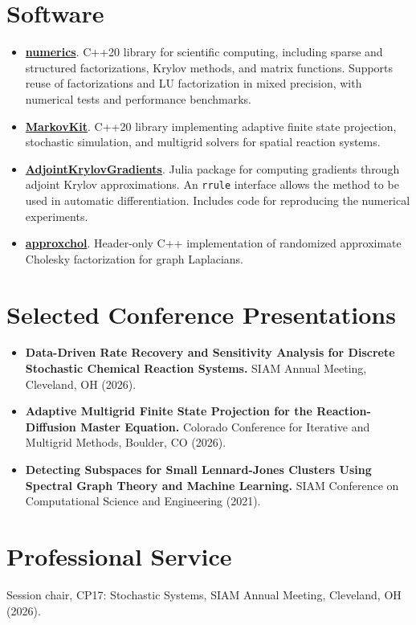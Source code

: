 \documentclass[11pt,letterpaper]{article}
\begin{document}
\section*{Software}
\begin{itemize}
\item \href{https://github.com/AdityaDendukuri/numerics}{\textbf{numerics}}.
C++20 library for scientific computing, including sparse and structured factorizations, Krylov
methods, and matrix functions. Supports reuse of factorizations and LU factorization in mixed
precision, with numerical tests and performance benchmarks.
\item \href{https://github.com/AdityaDendukuri/markovkit}{\textbf{MarkovKit}}.
C++20 library implementing adaptive finite state projection, stochastic simulation,
and multigrid solvers for spatial reaction systems.
\item \href{https://github.com/AdityaDendukuri/AdjointKrylovGradients}{\textbf{AdjointKrylovGradients}}.
Julia package for computing gradients through adjoint Krylov approximations. An \texttt{rrule}
interface allows the method to be used in automatic differentiation. Includes code for reproducing
the numerical experiments.
\item \href{https://github.com/AdityaDendukuri/approxchol}{\textbf{approxchol}}.
Header-only C++ implementation of randomized approximate Cholesky factorization for graph Laplacians.
\end{itemize}

\section*{Selected Conference Presentations}
\begin{itemize}
\item \textbf{Data-Driven Rate Recovery and Sensitivity Analysis for Discrete Stochastic Chemical Reaction Systems.}
SIAM Annual Meeting, Cleveland, OH (2026).
\item \textbf{Adaptive Multigrid Finite State Projection for the Reaction-Diffusion Master Equation.}
Colorado Conference for Iterative and Multigrid Methods, Boulder, CO (2026).
\item \textbf{Detecting Subspaces for Small Lennard-Jones Clusters Using Spectral Graph Theory and Machine Learning.}
SIAM Conference on Computational Science and Engineering (2021).
\end{itemize}

\section*{Professional Service}
Session chair, CP17: Stochastic Systems, SIAM Annual Meeting, Cleveland, OH (2026).
\end{document}
